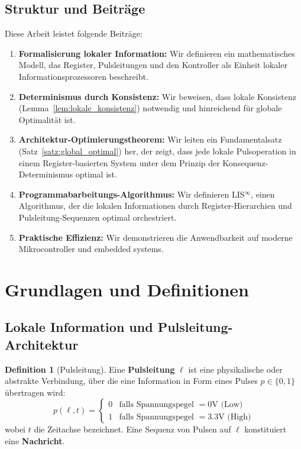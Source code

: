 \documentclass[a4paper,12pt]{article}
\theoremstyle{definition}
\newtheorem{definition}{Definition}
\begin{document}
\subsection{Struktur und Beiträge}

Diese Arbeit leistet folgende Beiträge:

\begin{enumerate}
	\item \textbf{Formalisierung lokaler Information:} Wir definieren ein mathematisches Modell, das Register, Pulsleitungen und den Kontroller als Einheit lokaler Informationsprozessoren beschreibt.
	
	\item \textbf{Determinismus durch Konsistenz:} Wir beweisen, dass lokale Konsistenz (Lemma~\ref{lem:lokale_konsistenz}) notwendig und hinreichend für globale Optimalität ist.
	
	\item \textbf{Architektur-Optimierungstheorem:} Wir leiten ein Fundamentalsatz (Satz~\ref{satz:global_optimal}) her, der zeigt, dass jede lokale Pulsoperation in einem Register-basierten System unter dem Prinzip der Konsequenz-Determinismus optimal ist.
	
	\item \textbf{Programmabarbeitungs-Algorithmus:} Wir definieren LIS$^{\infty}$, einen Algorithmus, der die lokalen Informationen durch Register-Hierarchien und Pulsleitung-Sequenzen optimal orchestriert.
	
	\item \textbf{Praktische Effizienz:} Wir demonstrieren die Anwendbarkeit auf moderne Mikrocontroller und embedded systems.
\end{enumerate}

\section{Grundlagen und Definitionen}

\subsection{Lokale Information und Pulsleitung-Architektur}

\begin{definition}[Pulsleitung]
	Eine \textbf{Pulsleitung} $\ell$ ist eine physikalische oder abstrakte Verbindung, über die eine Information in Form eines Pulses $p \in \{0, 1\}$ übertragen wird:
	\[
	p(\ell, t) = \begin{cases}
		0 & \text{falls Spannungspegel } = 0\text{V (Low)} \\
		1 & \text{falls Spannungspegel } = 3.3\text{V (High)}
	\end{cases}
	\]
	wobei $t$ die Zeitachse bezeichnet. Eine Sequenz von Pulsen auf $\ell$ konstituiert eine \textbf{Nachricht}.
\end{definition}
\end{document}
